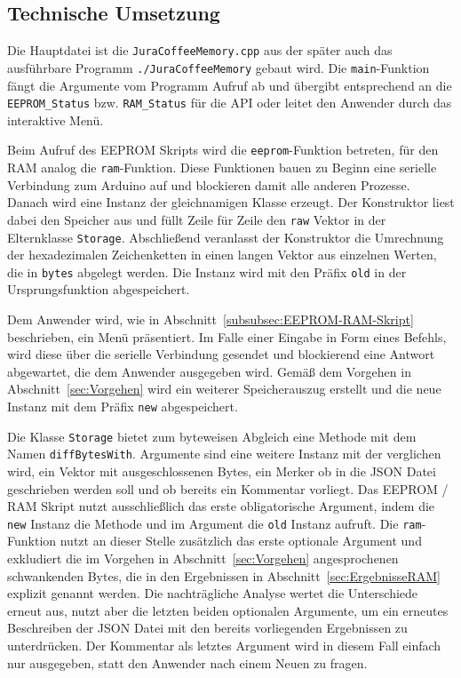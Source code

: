 \subsection{Technische Umsetzung}
Die Hauptdatei ist die \texttt{JuraCoffeeMemory.cpp} aus der später auch das ausführbare Programm \texttt{./JuraCoffeeMemory} gebaut wird.
Die \texttt{main}-Funktion fängt die Argumente vom Programm Aufruf ab und übergibt entsprechend an die \texttt{EEPROM\_Status} bzw. \texttt{RAM\_Status} für die \ac{API} oder leitet den Anwender durch das interaktive Menü.

Beim Aufruf des \ac{EEPROM} Skripts wird die \texttt{eeprom}-Funktion betreten, für den \ac{RAM} analog die \texttt{ram}-Funktion.
Diese Funktionen bauen zu Beginn eine serielle Verbindung zum Arduino auf und blockieren damit alle anderen Prozesse.
Danach wird eine Instanz der gleichnamigen Klasse erzeugt.
Der Konstruktor liest dabei den Speicher aus und füllt Zeile für Zeile den \texttt{raw} Vektor in der Elternklasse \texttt{Storage}.
Abschließend veranlasst der Konstruktor die Umrechnung der hexadezimalen Zeichenketten in einen langen Vektor aus einzelnen Werten, die in \texttt{bytes} abgelegt werden.
Die Instanz wird mit den Präfix \texttt{old} in der Ursprungsfunktion abgespeichert.

Dem Anwender wird, wie in Abschnitt~\ref{subsubsec:EEPROM-RAM-Skript} beschrieben, ein Menü präsentiert.
Im Falle einer Eingabe in Form eines Befehls, wird diese über die serielle Verbindung gesendet und blockierend eine Antwort abgewartet, die dem Anwender ausgegeben wird.
Gemäß dem Vorgehen in Abschnitt~\ref{sec:Vorgehen} wird ein weiterer Speicherauszug erstellt und die neue Instanz mit dem Präfix \texttt{new} abgespeichert.

Die Klasse \texttt{Storage} bietet zum byteweisen Abgleich eine Methode mit dem Namen \texttt{diffBytesWith}.
Argumente sind eine weitere Instanz mit der verglichen wird, ein Vektor mit ausgeschlossenen Bytes, ein Merker ob in die \ac{JSON} Datei geschrieben werden soll und ob bereits ein Kommentar vorliegt.
Das \ac{EEPROM} / \ac{RAM} Skript nutzt ausschließlich das erste obligatorische Argument, indem die \texttt{new} Instanz die Methode und im Argument die \texttt{old} Instanz aufruft.
Die \texttt{ram}-Funktion nutzt an dieser Stelle zusätzlich das erste optionale Argument und exkludiert die im Vorgehen in Abschnitt~\ref{sec:Vorgehen} angesprochenen schwankenden Bytes, die in den Ergebnissen in Abschnitt~\ref{sec:ErgebnisseRAM} explizit genannt werden.
Die nachträgliche Analyse wertet die Unterschiede erneut aus, nutzt aber die letzten beiden optionalen Argumente, um ein erneutes Beschreiben der \ac{JSON} Datei mit den bereits vorliegenden Ergebnissen zu unterdrücken.
Der Kommentar als letztes Argument wird in diesem Fall einfach nur ausgegeben, statt den Anwender nach einem Neuen zu fragen.

